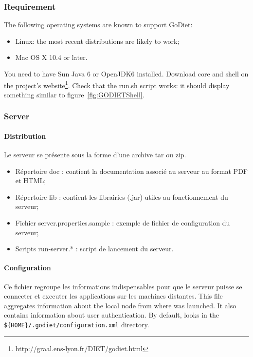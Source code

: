 \subsubsection{Requirement}

The following operating systems are known to support GoDiet:
\begin{itemize}
    \item Linux: the most recent distributions are likely to work;
    \item Mac OS X 10.4 or later.
\end{itemize}

You need to have Sun Java 6 or OpenJDK6 installed.
Download \godiet core and shell on the project's website\footnote{http://graal.ens-lyon.fr/DIET/godiet.html}.
Check that the run.sh script works: it should display something similar to figure~\ref{fig:GODIETShell}.





\subsubsection{\godiet Server}

\paragraph{Distribution}

Le serveur se présente sous la forme d'une archive tar ou zip. 

\begin{itemize}
   \item Répertoire doc : contient la documentation associé au serveur au format PDF et HTML;
   \item Répertoire lib : contient les librairies (.jar) utiles au fonctionnement du serveur;
   \item Fichier server.properties.sample : exemple de fichier de configuration du serveur;
   \item Scripts run-server.* : script de lancement du serveur.
\end{itemize}



\paragraph{Configuration}
 Ce fichier regroupe les informations indispensables pour que le serveur puisse se connecter et executer les applications sur les machines distantes.
This file aggregates information about the local node from where \godiet was launched. It also contains information about user authentication.
By default, \godiet looks in the \verb+${HOME}/.godiet/configuration.xml+ directory.

